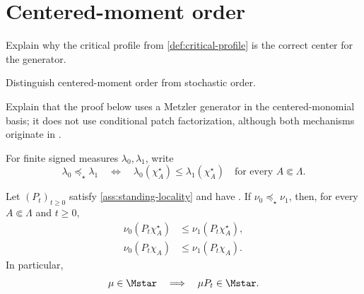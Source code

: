 \section{Centered-moment order}
\label{sec:centered-order}

\begin{discussion}
  \item Explain why the critical profile from
  \cref{def:critical-profile} is the correct center for the generator.
  \item Distinguish centered-moment order from stochastic order.
  \item Explain that the proof below uses a Metzler generator in the
  centered-monomial basis; it does not use conditional patch
  factorization, although both mechanisms originate in
  \patchpositivity.
\end{discussion}

\begin{definition}
\label{def:centered-order}
For finite signed measures \(\lambda_0,\lambda_1\), write
\[
  \lambda_0\preceq_\star\lambda_1
  \quad\Longleftrightarrow\quad
  \lambda_0(\chi_A^\star)
  \le
  \lambda_1(\chi_A^\star)
  \quad\text{for every }A\Subset\Lambda.
\]
\end{definition}

\begin{theorem}
\label{thm:centered-order}
Let \((P_t)_{t\ge0}\) satisfy
\cref{ass:standing-locality} and have \patchpositivity. If
\(\nu_0\preceq_\star\nu_1\), then, for every
\(A\Subset\Lambda\) and \(t\ge0\),
\begin{align}
  \nu_0(P_t\chi_A^\star)
  &\le
  \nu_1(P_t\chi_A^\star),
  \label{eq:centered-order}
  \\
  \nu_0(P_t\chi_A)
  &\le
  \nu_1(P_t\chi_A).
  \label{eq:ordinary-moment-order}
\end{align}
In particular,
\begin{equation}
  \mu\in\Mstar
  \quad\Longrightarrow\quad
  \mu P_t\in\Mstar.
  \label{eq:Mstar-preserved}
\end{equation}
\end{theorem}

